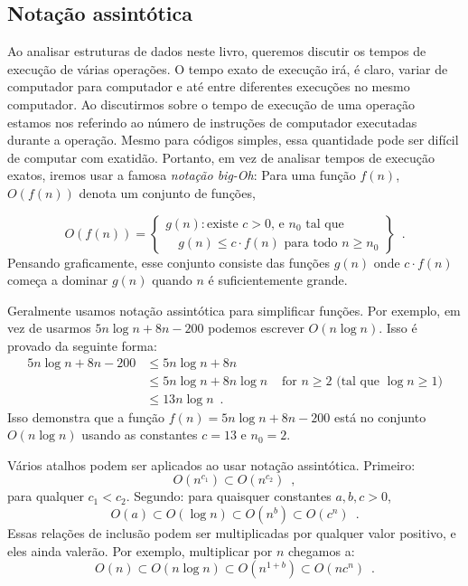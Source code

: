 \subsection{Notação assintótica}

%
%
%
Ao analisar estruturas de dados neste livro, queremos discutir
os tempos de execução de várias operações. O tempo exato de execução irá,
é claro, variar de computador para computador e até entre diferentes execuções 
no mesmo computador.
Ao discutirmos sobre o tempo de execução de uma operação estamos nos 
referindo ao número de instruções de computador executadas durante a operação.
Mesmo para códigos simples, essa quantidade pode ser difícil de computar com exatidão.
Portanto, em vez de analisar tempos de execução exatos, iremos usar a famosa \emph{notação big-Oh}: Para uma função $f(n)$, $O(f(n))$ denota um conjunto de funções,

\[
   O(f(n)) = \left\{
     \begin{array}{l}
       g(n):\mbox{existe $c>0$, e $n_0$ tal que} \\
             \quad\mbox{$g(n) \le c\cdot f(n)$ para todo $n\ge n_0$}   
     \end{array} \right\} \enspace .
\]
Pensando graficamente, esse conjunto consiste das funções $g(n)$ 
onde 
$c\cdot f(n)$ começa a dominar $g(n)$ quando $n$ é suficientemente grande. 

Geralmente usamos notação assintótica para simplificar funções. Por exemplo,
em vez de usarmos $5n\log n + 8n - 200$ podemos escrever $O(n\log n)$.
Isso é provado da seguinte forma:
\begin{align*} 
       5n\log n + 8n - 200
        & \le 5n\log n + 8n \\
        & \le 5n\log n + 8n\log n & \mbox{ for $n\ge 2$ (tal que $\log n \ge 1$)}
            \\
        & \le 13n\log n  \enspace .
\end{align*}
Isso demonstra que a função $f(n)=5n\log n + 8n - 200$ está no conjunto 
$O(n\log n)$ usando as constantes $c=13$ e $n_0 = 2$.

Vários atalhos podem ser aplicados ao usar notação assintótica. 
Primeiro:
\[ O(n^{c_1}) \subset O(n^{c_2}) \enspace ,\]
para qualquer $c_1 < c_2$.  Segundo: para quaisquer constantes $a,b,c > 0$,
\[ O(a) \subset O(\log n) \subset O(n^{b}) \subset O({c}^n) \enspace . \]
Essas relações de inclusão podem ser multiplicadas por qualquer valor positivo,
e eles ainda valerão.
Por exemplo, multiplicar por $n$ chegamos a:
\[ O(n) \subset O(n\log n) \subset O(n^{1+b}) \subset O(n{c}^n) \enspace . \]

